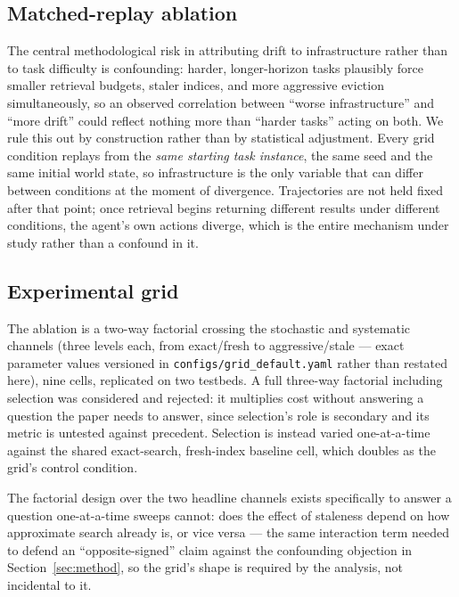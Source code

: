 \documentclass{article}
\begin{document}
\subsection{Matched-replay ablation}

The central methodological risk in attributing drift to infrastructure rather than to task difficulty is confounding: harder, longer-horizon tasks plausibly force smaller retrieval budgets, staler indices, and more aggressive eviction simultaneously, so an observed correlation between ``worse infrastructure'' and ``more drift'' could reflect nothing more than ``harder tasks'' acting on both. We rule this out by construction rather than by statistical adjustment. Every grid condition replays from the \emph{same starting task instance}, the same seed and the same initial world state, so infrastructure is the only variable that can differ between conditions at the moment of divergence. Trajectories are not held fixed after that point; once retrieval begins returning different results under different conditions, the agent's own actions diverge, which is the entire mechanism under study rather than a confound in it.

\subsection{Experimental grid}

The ablation is a two-way factorial crossing the stochastic and systematic channels (three levels each, from exact/fresh to aggressive/stale --- exact parameter values versioned in \texttt{configs/grid\_default.yaml} rather than restated here), nine cells, replicated on two testbeds. A full three-way factorial including selection was considered and rejected: it multiplies cost without answering a question the paper needs to answer, since selection's role is secondary and its metric is untested against precedent. Selection is instead varied one-at-a-time against the shared exact-search, fresh-index baseline cell, which doubles as the grid's control condition.

The factorial design over the two headline channels exists specifically to answer a question one-at-a-time sweeps cannot: does the effect of staleness depend on how approximate search already is, or vice versa --- the same interaction term needed to defend an ``opposite-signed'' claim against the confounding objection in Section~\ref{sec:method}, so the grid's shape is required by the analysis, not incidental to it.
\end{document}

